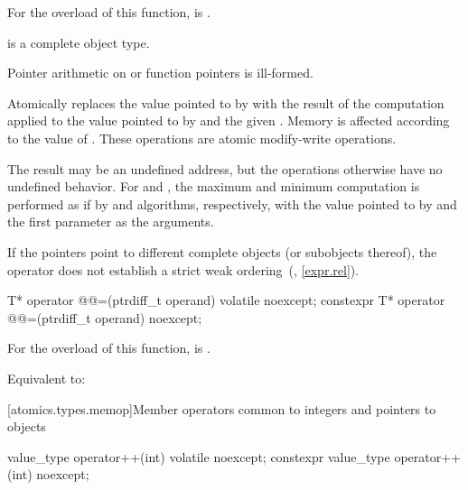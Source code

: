 \begin{itemdescr}
\pnum
\constraints
For the  overload of this function,
 is .

\pnum
\mandates
{} is a complete object type.
\begin{note}
Pointer arithmetic on  or function pointers is ill-formed.
\end{note}

\pnum
\effects
Atomically replaces the value pointed to by 
with the result of the computation applied to
the value pointed to by  and the given .
Memory is affected according to the value of .
These operations are atomic modify-write operations.

\pnum
\remarks
The result may be an undefined address,
but the operations otherwise have no undefined behavior.
For  and ,
the maximum and minimum computation is performed
as if by  and  algorithms, respectively,
with the value pointed to by  and
the first parameter as the arguments.
\begin{note}
If the pointers point to different complete objects (or subobjects thereof),
the \tcode{<} operator does not establish
a strict weak ordering~(, \ref{expr.rel}).
\end{note}
\end{itemdescr}

%
%
\begin{itemdecl}
T* operator @@=(ptrdiff_t operand) volatile noexcept;
constexpr T* operator @@=(ptrdiff_t operand) noexcept;
\end{itemdecl}

\begin{itemdescr}
\pnum
\constraints
For the  overload of this function,
 is .

\pnum
\effects
Equivalent to: 
\end{itemdescr}

[atomics.types.memop]{Member operators common to integers and pointers to objects}

%
%
\begin{itemdecl}
value_type operator++(int) volatile noexcept;
constexpr value_type operator++(int) noexcept;
\end{itemdecl}

